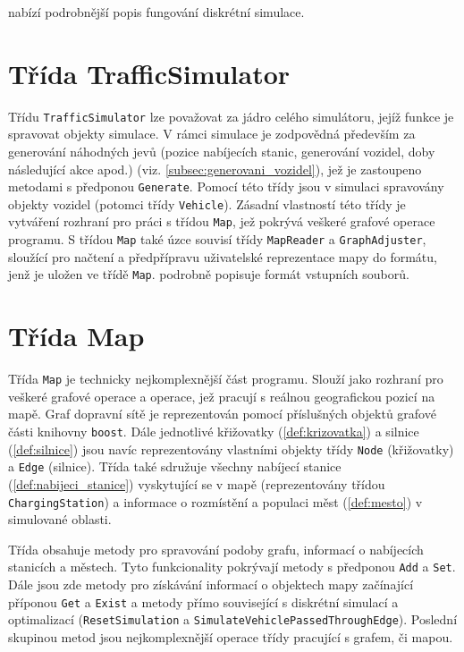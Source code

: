  nabízí podrobnější popis fungování diskrétní
simulace.


\section{Třída TrafficSimulator}

Třídu \texttt{TrafficSimulator} lze považovat za jádro celého simulátoru, jejíž funkce
je spravovat objekty simulace. V rámci simulace je zodpovědná především za
generování náhodných jevů (pozice nabíjecích stanic, generování vozidel, doby 
následující akce apod.) (viz. \cref{subsec:generovani_vozidel}), 
jež je zastoupeno metodami s předponou \texttt{Generate}. Pomocí této třídy jsou v simulaci
spravovány objekty vozidel (potomci třídy \texttt{Vehicle}). Zásadní vlastností této třídy
je vytváření rozhraní pro práci s třídou \texttt{Map}, jež pokrývá veškeré grafové 
operace programu. S třídou \texttt{Map} také úzce souvisí třídy 
\texttt{MapReader} a \texttt{GraphAdjuster}, sloužící pro načtení a předpřípravu
uživatelské reprezentace mapy do formátu, jenž je uložen
ve třídě \texttt{Map}.  podrobně popisuje formát vstupních souborů.


\section{Třída Map}

Třída \texttt{Map} je technicky nejkomplexnější část programu. Slouží
jako rozhraní pro veškeré grafové operace a operace, jež pracují s reálnou
geografickou pozicí na mapě. Graf dopravní sítě je reprezentován pomocí 
příslušných objektů grafové části knihovny \texttt{boost}. Dále jednotlivé křižovatky 
(\cref{def:krizovatka}) a silnice (\cref{def:silnice}) jsou navíc reprezentovány 
vlastními objekty třídy \texttt{Node} (křižovatky) a \texttt{Edge} (silnice). 
Třída také sdružuje všechny nabíjecí stanice (\cref{def:nabijeci_stanice}) vyskytující 
se v mapě (reprezentovány třídou \texttt{ChargingStation}) a informace o rozmístění a 
populaci měst (\cref{def:mesto}) v simulované oblasti.

Třída obsahuje metody pro spravování podoby grafu, informací o nabíjecích 
stanicích a městech. Tyto funkcionality pokrývají metody s předponou \texttt{Add} a 
\texttt{Set}. Dále jsou zde metody pro získávání informací o objektech mapy začínající
příponou \texttt{Get} a \texttt{Exist} a metody přímo související s diskrétní simulací a 
optimalizací (\texttt{ResetSimulation} a \texttt{SimulateVehiclePassedThroughEdge}). Poslední
skupinou metod jsou nejkomplexnější operace třídy pracující s grafem, či mapou.


